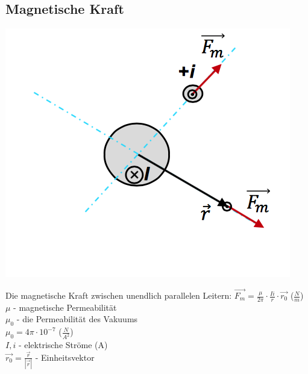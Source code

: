  \subsection{Magnetische Kraft}
 
 \begin{minipage}{0.5 \linewidth}
 \includegraphics[width = \linewidth]{./Pics/VL1/elMag}
 \end{minipage}
 \begin{minipage}{0.5 \linewidth}
Die magnetische Kraft zwischen unendlich parallelen Leitern:
$ \vec{F_{m}} = \frac{\mu}{2 \pi} \cdot \frac{Ii}{r} \cdot \vec{r_{0}}$  ($\frac{N}{m}$) \\
$\mu$ - magnetische Permeabilität \\
$\mu_{0}$ - die Permeabilität des Vakuums \\
$\mu_{0} = 4 \pi \cdot 10^{-7}$ ($\frac{N}{A^{2}}$) \\
$I,i$ - elektrische Ströme (A) \\
$\vec{r_{0}} = \frac{\vec{r}}{|\vec{r}|} $ - Einheitsvektor \\
  \end{minipage}
  
